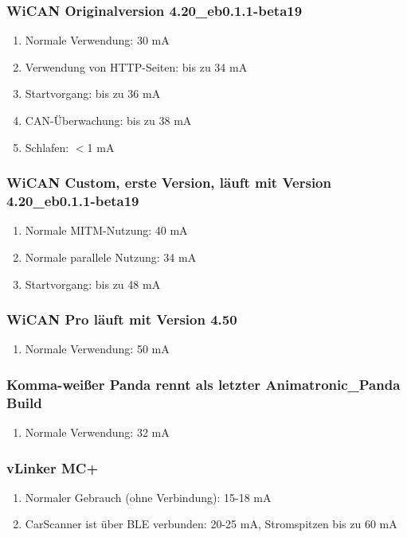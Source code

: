 \documentclass[superscriptaddress,onecolumn,floatfix]{revtex4-2}
\begin{document}
\subsubsection{WiCAN Originalversion 4.20\_eb0.1.1-beta19}
\begin{enumerate}
  \item{Normale Verwendung:} 30 mA
  \item{Verwendung von HTTP-Seiten:} bis zu 34 mA
  \item{Startvorgang:} bis zu 36 mA
  \item{CAN-Überwachung:} bis zu 38 mA
  \item{Schlafen:} $<$1 mA
\end{enumerate}

\subsubsection{WiCAN Custom, erste Version, läuft mit Version 4.20\_eb0.1.1-beta19}
\begin{enumerate}
  \item{Normale MITM-Nutzung:} 40 mA
  \item{Normale parallele Nutzung:} 34 mA
  \item{Startvorgang:} bis zu 48 mA
\end{enumerate}

\subsubsection{WiCAN Pro läuft mit Version 4.50}
\begin{enumerate}
  \item{Normale Verwendung:} 50 mA
\end{enumerate}

\subsubsection{Komma-weißer Panda rennt als letzter Animatronic\_Panda Build}
\begin{enumerate}
  \item{Normale Verwendung:} 32 mA
\end{enumerate}

\subsubsection{vLinker MC+}
\begin{enumerate}
  \item{Normaler Gebrauch (ohne Verbindung):} 15-18 mA
  \item{CarScanner ist über BLE verbunden:} 20-25 mA, Stromspitzen bis zu 60 mA
\end{enumerate}
\end{document}
